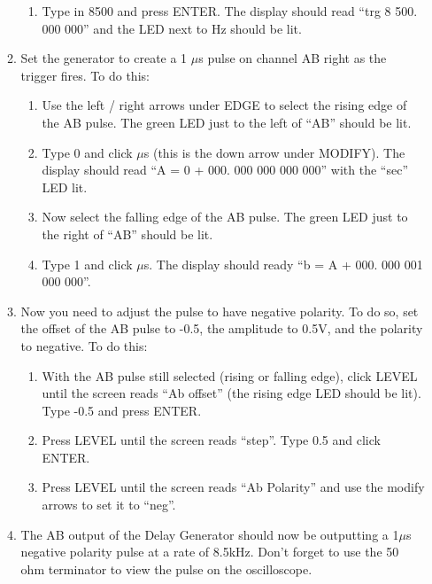 \documentclass{../lab}
\begin{document}
\begin{enumerate}
\begin{enumerate}
\begin{enumerate}
            \item Type in 8500 and press ENTER. The display should read ``trg 8 500. 000 000'' and the LED next to Hz should be lit.

        \end{enumerate}

        \item Set the generator to create a 1 $\mu$s pulse on channel AB right as the trigger fires. To do this:
        \begin{enumerate}
            \item Use the left / right arrows under EDGE to select the rising edge of the AB pulse. The green LED just to the left of ``AB'' should be lit.

            \item Type 0 and click $\mu$s (this is the down arrow under MODIFY). The display should read ``A = 0 + 000. 000 000 000 000'' with the ``sec'' LED lit.

            \item Now select the falling edge of the AB pulse. The green LED just to the right of ``AB'' should be lit.

            \item Type 1 and click $\mu$s. The display should ready ``b = A + 000. 000 001 000 000''.

        \end{enumerate}

        \item Now you need to adjust the pulse to have negative polarity. To do so, set the offset of the AB pulse to -0.5, the amplitude to 0.5V, and the polarity to negative. To do this:
        \begin{enumerate}
            \item With the AB pulse still selected (rising or falling edge), click LEVEL until the screen reads ``Ab offset'' (the rising edge LED should be lit). Type -0.5 and press ENTER.

            \item Press LEVEL until the screen reads ``step''. Type 0.5 and click ENTER.

            \item Press LEVEL until the screen reads ``Ab Polarity'' and use the modify arrows to set it to ``neg''.

        \end{enumerate}

        \item The AB output of the Delay Generator should now be outputting a 1$\mu$s negative polarity pulse at a rate of 8.5kHz. Don't forget to use the 50 ohm terminator to view the pulse on the oscilloscope.


\end{enumerate}
\end{enumerate}
\end{document}
